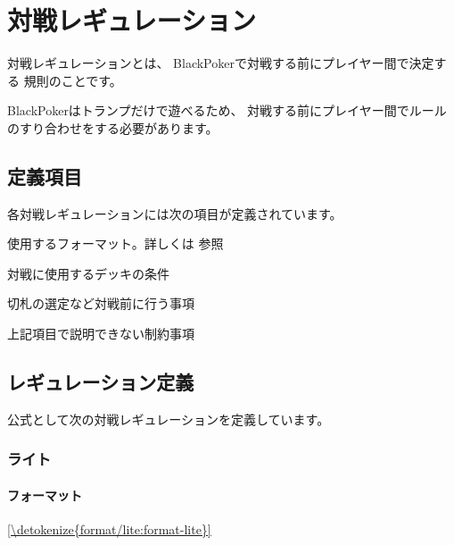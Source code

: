 \documentclass[letterpaper,10pt,dvipdfmx]{sphinxmanual}
\begin{document}
\sphinxstepscope


\chapter{対戦レギュレーション}
\label{\detokenize{match-regulations/match-regulations:id1}}\label{\detokenize{match-regulations/match-regulations::doc}}
\sphinxAtStartPar
対戦レギュレーションとは、
BlackPokerで対戦する前にプレイヤー間で決定する
規則のことです。

\sphinxAtStartPar
BlackPokerはトランプだけで遊べるため、
対戦する前にプレイヤー間でルールのすり合わせをする必要があります。


\section{定義項目}
\label{\detokenize{match-regulations/match-regulations:id2}}
\sphinxAtStartPar
各対戦レギュレーションには次の項目が定義されています。
\begin{description}
\sphinxAtStartPar
使用するフォーマット。詳しくは {\hyperref[\detokenize{format/format::doc}]{}} 参照

\sphinxAtStartPar
対戦に使用するデッキの条件

\sphinxAtStartPar
切札の選定など対戦前に行う事項

\sphinxAtStartPar
上記項目で説明できない制約事項

\end{description}


\section{レギュレーション定義}
\label{\detokenize{match-regulations/match-regulations:id3}}
\sphinxAtStartPar
公式として次の対戦レギュレーションを定義しています。

\sphinxstepscope


\subsection{ライト}
\label{\detokenize{match-regulations/lite:id1}}\label{\detokenize{match-regulations/lite::doc}}

\subsubsection{フォーマット}
\label{\detokenize{match-regulations/lite:id2}}
\sphinxAtStartPar
\hyperref[\detokenize{format/lite:format-lite}]{\ref{\detokenize{format/lite:format-lite}} }
\end{document}
